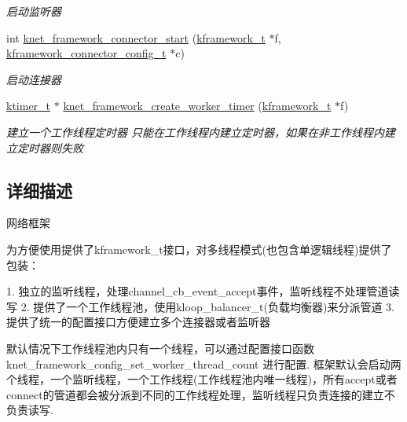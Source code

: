 \begin{DoxyCompactItemize}
\begin{DoxyCompactList}\small\item\em 启动监听器 \end{DoxyCompactList}\item 
int \hyperlink{a00106_ga28cdba2072f2c191547c0450d040d536_ga28cdba2072f2c191547c0450d040d536}{knet\+\_\+framework\+\_\+connector\+\_\+start} (\hyperlink{a00053_a3195a3be35782fc1efb920c811be111d_a3195a3be35782fc1efb920c811be111d}{kframework\+\_\+t} $\ast$f, \hyperlink{a00053_a44d3033eba5a4fd784a741700a7a2521_a44d3033eba5a4fd784a741700a7a2521}{kframework\+\_\+connector\+\_\+config\+\_\+t} $\ast$c)
\begin{DoxyCompactList}\small\item\em 启动连接器 \end{DoxyCompactList}\item 
\hyperlink{a00053_a846172ea4e8a86449eca41a3d8e074b7_a846172ea4e8a86449eca41a3d8e074b7}{ktimer\+\_\+t} $\ast$ \hyperlink{a00106_gaf740887dd472ce5bb57263e156e3e75e_gaf740887dd472ce5bb57263e156e3e75e}{knet\+\_\+framework\+\_\+create\+\_\+worker\+\_\+timer} (\hyperlink{a00053_a3195a3be35782fc1efb920c811be111d_a3195a3be35782fc1efb920c811be111d}{kframework\+\_\+t} $\ast$f)
\begin{DoxyCompactList}\small\item\em 建立一个工作线程定时器 只能在工作线程内建立定时器，如果在非工作线程内建立定时器则失败 \end{DoxyCompactList}\end{DoxyCompactItemize}


\subsection{详细描述}
网络框架 


\begin{DoxyPre}
为方便使用提供了kframework\_t接口，对多线程模式(也包含单逻辑线程)提供了包装：\end{DoxyPre}



\begin{DoxyPre}1. 独立的监听线程，处理channel\_cb\_event\_accept事件，监听线程不处理管道读写
2. 提供了一个工作线程池，使用kloop\_balancer\_t(负载均衡器)来分派管道
3. 提供了统一的配置接口方便建立多个连接器或者监听器\end{DoxyPre}



\begin{DoxyPre}默认情况下工作线程池内只有一个线程，可以通过配置接口函数knet\_framework\_config\_set\_worker\_thread\_count
进行配置. 框架默认会启动两个线程，一个监听线程，一个工作线程(工作线程池内唯一线程)，所有accept或者
connect的管道都会被分派到不同的工作线程处理，监听线程只负责连接的建立不负责读写.\end{DoxyPre}



